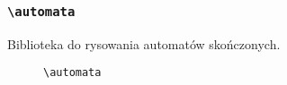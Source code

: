 \documentclass[10pt,t]{beamer}
\begin{document}
\begin{frame}
  \frametitle{\texttt{\textbackslash automata}}


  Biblioteka do rysowania automatów skończonych.





  \begin{figure}

    \centering


    \begin{tikzpicture}








    \end{tikzpicture}


    \caption{\texttt{\textbackslash automata}}

  \end{figure}

\end{frame}










\appendix
















\end{document}
